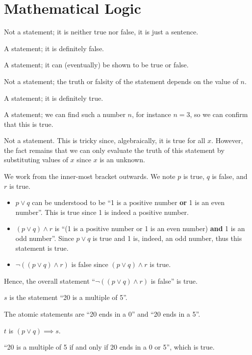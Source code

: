 \section{Mathematical Logic}
\begin{questions}
    \item \begin{partquestions}{\alph*}
        \item Not a statement; it is neither true nor false, it is just a sentence.
        \item A statement; it is definitely false.
        \item A statement; it can (eventually) be shown to be true or false.
        \item Not a statement; the truth or falsity of the statement depends on the value of $n$.
        \item A statement; it is definitely true.
        \item A statement; we can find such a number $n$, for instance $n = 3$, so we can confirm that this is true.
        \item Not a statement. This is tricky since, algebraically, it is true for all $x$. However, the fact remains that we can only evaluate the truth of this statement by substituting values of $x$ since $x$ is an unknown.
    \end{partquestions}

    \item We work from the inner-most bracket outwards. We note $p$ is true, $q$ is false, and $r$ is true.
    \begin{itemize}
        \item $p \lor q$ can be understood to be ``1 is a positive number \textbf{or} 1 is an even number''. This is true since 1 is indeed a positive number.
        \item $(p \lor q) \land r$ is ``(1 is a positive number or 1 is an even number) \textbf{and} 1 is an odd number''. Since $p \lor q$ is true and 1 is, indeed, an odd number, thus this statement is true.
        \item $\lnot((p \lor q) \land r)$ is false since $(p \lor q) \land r$ is true.
    \end{itemize}
    Hence, the overall statement ``$\lnot((p \lor q) \land r)$ is false'' is true.

    \item \begin{partquestions}{\roman*}
        \item $s$ is the statement ``20 is a multiple of 5''.
        \item The atomic statements are ``20 ends in a 0'' and ``20 ends in a 5''.
        \item $t$ is $(p \lor q) \implies s$.
        \item ``20 is a multiple of 5 if and only if 20 ends in a 0 or 5'', which is true.
    \end{partquestions}


\end{questions}

